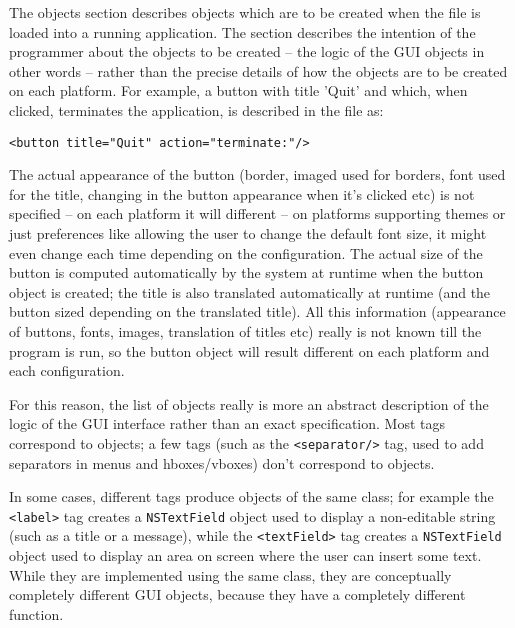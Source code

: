 The objects section describes objects which are to be created when the
file is loaded into a running application.  The section describes the
intention of the programmer about the objects to be created -- the
logic of the GUI objects in other words -- rather than the precise
details of how the objects are to be created on each platform.  For
example, a button with title 'Quit' and which, when clicked,
terminates the application, is described in the file as:
\begin{verbatim}
<button title="Quit" action="terminate:"/>
\end{verbatim}
The actual appearance of the button (border, imaged used for borders,
font used for the title, changing in the button appearance when it's
clicked etc) is not specified -- on each platform it will different --
on platforms supporting themes or just preferences like allowing the
user to change the default font size, it might even change each time
depending on the configuration.  The actual size of the button is
computed automatically by the system at runtime when the button object
is created; the title is also translated automatically at runtime (and
the button sized depending on the translated title).  All this
information (appearance of buttons, fonts, images, translation of
titles etc) really is not known till the program is run, so the button
object will result different on each platform and each configuration.

For this reason, the list of objects really is more an abstract
description of the logic of the GUI interface rather than an exact
specification.  Most tags correspond to objects; a few tags (such as
the \texttt{<separator/>} tag, used to add separators in menus and
hboxes/vboxes) don't correspond to objects.

In some cases, different tags produce objects of the same class; for
example the \texttt{<label>} tag creates a \texttt{NSTextField} object
used to display a non-editable string (such as a title or a message),
while the \texttt{<textField>} tag creates a \texttt{NSTextField}
object used to display an area on screen where the user can insert
some text.  While they are implemented using the same class, they are
conceptually completely different GUI objects, because they have a
completely different function.

